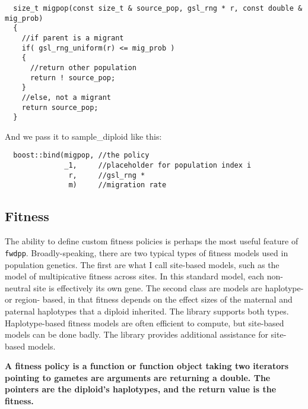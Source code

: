 \documentclass{article}
\begin{document}
\begin{lstlisting}
  size_t migpop(const size_t & source_pop, gsl_rng * r, const double & mig_prob)
  {
    //if parent is a migrant
    if( gsl_rng_uniform(r) <= mig_prob )
    {
      //return other population
      return ! source_pop;
    }
    //else, not a migrant
    return source_pop;
  }
\end{lstlisting}

And we pass it to sample\_diploid like this:
\begin{lstlisting}
  boost::bind(migpop, //the policy
              _1,     //placeholder for population index i
               r,     //gsl_rng *
               m)     //migration rate
\end{lstlisting}
\subsection{Fitness}
The ability to define custom fitness policies is perhaps the most useful feature of \texttt{fwdpp}.  Broadly-speaking, there are two typical types of fitness models used in population genetics.  The first are what I call site-based models, such as the model of multipicative fitness across sites.  In this standard model, each non-neutral site is effectively its own gene.  The second class are models are haplotype- or region- based, in that fitness depends on the effect sizes of the maternal and paternal haplotypes that a diploid inherited.  The library supports both types.  Haplotype-based fitness models are often efficient to compute, but site-based models can be done badly.  The library provides additional assistance for site-based models.

\textbf{A fitness policy is a function or function object taking two iterators pointing to gametes are arguments are returning a double.  The pointers are the diploid's haplotypes, and the return value is the fitness.}
\end{document}
